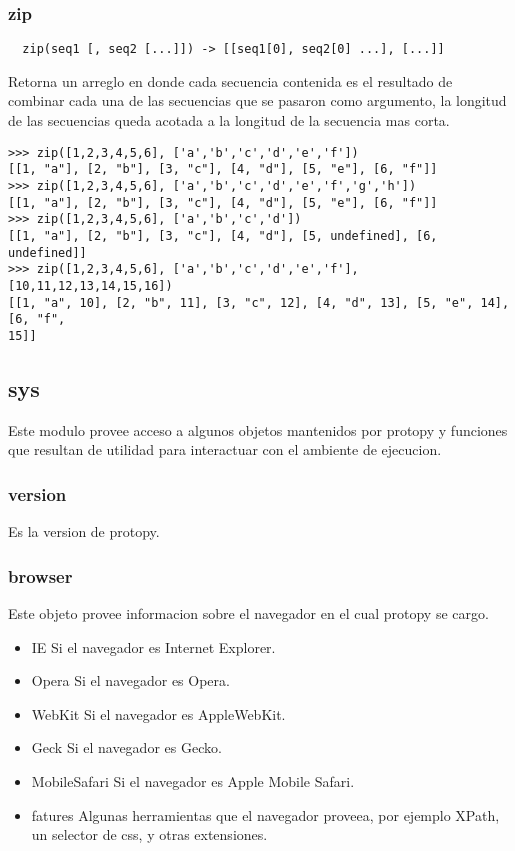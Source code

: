 \subsubsection*{zip}
\begin{verbatim}
  zip(seq1 [, seq2 [...]]) -> [[seq1[0], seq2[0] ...], [...]]
\end{verbatim}
Retorna un arreglo en donde cada secuencia contenida es el resultado de combinar
cada una de las secuencias que se pasaron como argumento, la longitud de las
secuencias queda acotada a la longitud de la secuencia mas corta.
\begin{lstlisting}[style=consola]
>>> zip([1,2,3,4,5,6], ['a','b','c','d','e','f'])
[[1, "a"], [2, "b"], [3, "c"], [4, "d"], [5, "e"], [6, "f"]]
>>> zip([1,2,3,4,5,6], ['a','b','c','d','e','f','g','h'])
[[1, "a"], [2, "b"], [3, "c"], [4, "d"], [5, "e"], [6, "f"]]
>>> zip([1,2,3,4,5,6], ['a','b','c','d'])
[[1, "a"], [2, "b"], [3, "c"], [4, "d"], [5, undefined], [6, undefined]]
>>> zip([1,2,3,4,5,6], ['a','b','c','d','e','f'], [10,11,12,13,14,15,16])
[[1, "a", 10], [2, "b", 11], [3, "c", 12], [4, "d", 13], [5, "e", 14], [6, "f",
15]]
\end{lstlisting}

\subsection{sys}
Este modulo provee acceso a algunos objetos mantenidos por protopy y funciones
que resultan de utilidad para interactuar con el ambiente de ejecucion.
\subsubsection*{version}
Es la version de protopy.
\subsubsection*{browser}
Este objeto provee informacion sobre el navegador en el cual protopy se cargo.
\begin{itemize}
 \item{IE} Si el navegador es Internet Explorer.
 \item{Opera} Si el navegador es Opera.
 \item{WebKit} Si el navegador es AppleWebKit.
 \item{Geck} Si el navegador es Gecko.
 \item{MobileSafari} Si el navegador es Apple Mobile Safari.
 \item{fatures} Algunas herramientas que el navegador proveea, por ejemplo
XPath, un selector de css, y otras extensiones.
\end{itemize}

